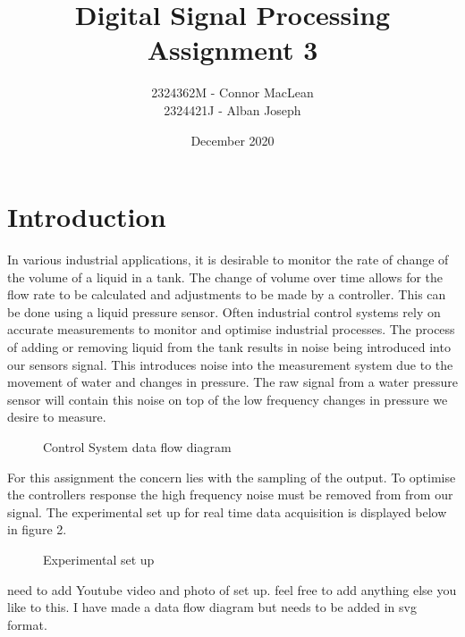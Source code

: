 \documentclass{article}
\title{Digital Signal Processing Assignment 3}
\author{2324362M - Connor MacLean\\2324421J - Alban Joseph}
\date{December 2020}
\begin{document}
\maketitle
\section{Introduction}

In various industrial applications, it is desirable to monitor the rate of change of the volume of a liquid in a tank. The change of volume over time allows for the flow rate to be calculated and adjustments to be made by a controller. This can be done using a liquid pressure sensor. Often industrial control systems rely on accurate measurements to monitor and optimise industrial processes. The process of adding or removing liquid from the tank results in noise being introduced into our sensors signal. This introduces noise into the measurement system due to the movement of water and changes in pressure. The raw signal from a water pressure sensor will contain this noise on top of the low frequency changes in pressure we desire to measure. 
\newline
\begin{figure}[h!]
    \centering
    
    \caption{Control System data flow diagram}
    \label{fig:universe}
\end{figure}
\newline 
For this assignment the concern lies with the sampling of the output. To optimise the controllers response the high frequency noise must be removed from from our signal. The experimental set up for real time data acquisition is displayed below in figure 2.
\newline
\begin{figure}[htbp]
  \centering
  
  \caption{Experimental set up}
\end{figure}
\newline 

need to add Youtube video and photo of set up.
feel free to add anything else you like to this. 
I have made a data flow diagram but needs to be added in svg format. 
\end{document}
